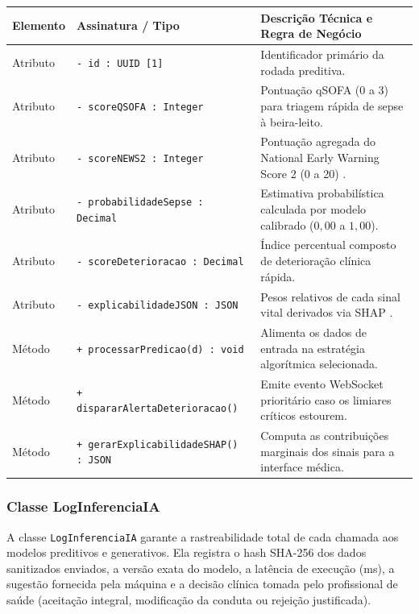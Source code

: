 \begingroup
\small
\noindent\begin{tabularx}{\linewidth}{l >{\raggedright\arraybackslash}p{5.7cm} >{\raggedright\arraybackslash}X}
\toprule
\textbf{Elemento} & \textbf{Assinatura / Tipo} & \textbf{Descrição Técnica e Regra de Negócio} \\
\midrule
Atributo & \texttt{- id : UUID [1]} & Identificador primário da rodada preditiva. \\
Atributo & \texttt{- scoreQSOFA : Integer} & Pontuação qSOFA (0 a 3) para triagem rápida de sepse à beira-leito. \\
Atributo & \texttt{- scoreNEWS2 : Integer} & Pontuação agregada do National Early Warning Score 2 (0 a 20) \cite{rcp_news2:2017}. \\
Atributo & \texttt{- probabilidadeSepse : Decimal} & Estimativa probabilística calculada por modelo calibrado ($0,00$ a $1,00$). \\
Atributo & \texttt{- scoreDeterioracao : Decimal} & Índice percentual composto de deterioração clínica rápida. \\
Atributo & \texttt{- explicabilidadeJSON : JSON} & Pesos relativos de cada sinal vital derivados via SHAP \cite{lundberg_shap:2017}. \\
\midrule
Método & \texttt{+ processarPredicao(d) : void} & Alimenta os dados de entrada na estratégia algorítmica selecionada. \\
Método & \texttt{+ dispararAlertaDeterioracao()} & Emite evento WebSocket prioritário caso os limiares críticos estourem. \\
Método & \texttt{+ gerarExplicabilidadeSHAP() : JSON} & Computa as contribuições marginais dos sinais para a interface médica. \\
\bottomrule
\end{tabularx}
\endgroup

\subsubsection{Classe LogInferenciaIA}
A classe \texttt{LogInferenciaIA} garante a rastreabilidade total de cada chamada aos modelos preditivos e generativos. Ela registra o hash SHA-256 dos dados sanitizados enviados, a versão exata do modelo, a latência de execução (ms), a sugestão fornecida pela máquina e a decisão clínica tomada pelo profissional de saúde (aceitação integral, modificação da conduta ou rejeição justificada).

